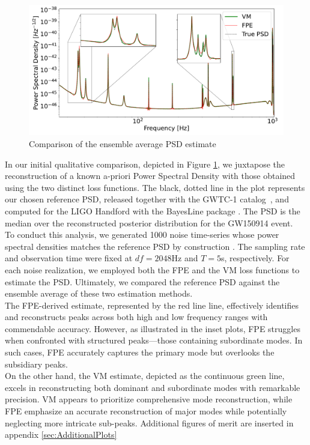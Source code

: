\documentclass[epj,nopacs]{svjour}
\begin{document}
\begin{figure}
	\centering
	\includegraphics[width = \linewidth]{Images/Plots/comparison_loss1}
	\caption{Comparison of the ensemble average PSD estimate}
	\label{fig:psd_comparison}
\end{figure}
In our initial qualitative comparison, depicted in Figure \ref{fig:psd_comparison}, we juxtapose the reconstruction of a known a-priori Power Spectral Density with those obtained using the two distinct loss functions. 
The black, dotted line in the plot represents our chosen reference PSD, released together with the GWTC-1 catalog~\cite{GWTC1,PSD_release}, and computed for the LIGO Handford with the BayesLine package \cite{Cornish_2015,Littenberg_2015,Cornish_2020,Chatziioannou_2019}. The PSD is the median over the reconstructed posterior distribution for the GW150914 event. \\ 
To conduct this analysis, we generated 1000 noise time-series whose power spectral densities matches the reference PSD by construction \cite{noiseGen}. The sampling rate and observation time were fixed at $df = 2048$Hz and $T = 5$s, respectively. For each noise realization, we employed both the FPE and the VM loss functions to estimate the PSD. Ultimately, we compared the reference PSD against the ensemble average of these two estimation methods.\\
The FPE-derived estimate, represented by the red line line, effectively identifies and reconstructs peaks across both high and low frequency ranges with commendable accuracy. However, as illustrated in the inset plots, FPE struggles when confronted with structured peaks—those containing subordinate modes. In such cases, FPE accurately captures the primary mode but overlooks the subsidiary peaks. \\ 
On the other hand, the VM estimate, depicted as the continuous green line, excels in reconstructing both dominant and subordinate modes with remarkable precision. VM appears to prioritize comprehensive mode reconstruction, while FPE emphasize an accurate reconstruction of major modes while potentially neglecting more intricate sub-peaks. 
Additional figures of merit are inserted in appendix \ref{sec:AdditionalPlots} 
\end{document}

